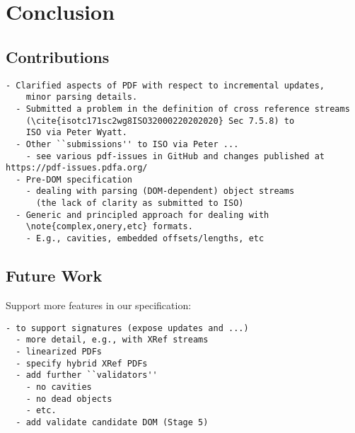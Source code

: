 \section{Conclusion }
\label{sec:conclusion}

\subsection{Contributions}

\begin{lstlisting}[style=meta]
  - Clarified aspects of PDF with respect to incremental updates,
    minor parsing details.
  - Submitted a problem in the definition of cross reference streams
    (\cite{isotc171sc2wg8ISO32000220202020} Sec 7.5.8) to
    ISO via Peter Wyatt.
  - Other ``submissions'' to ISO via Peter ...
    - see various pdf-issues in GitHub and changes published at https://pdf-issues.pdfa.org/
  - Pre-DOM specification
    - dealing with parsing (DOM-dependent) object streams
      (the lack of clarity as submitted to ISO)
  - Generic and principled approach for dealing with
    \note{complex,onery,etc} formats.
    - E.g., cavities, embedded offsets/lengths, etc
\end{lstlisting}

\subsection{Future Work}

Support more features in our specification:
\begin{lstlisting}[style=meta]
  - to support signatures (expose updates and ...)
  - more detail, e.g., with XRef streams
  - linearized PDFs
  - specify hybrid XRef PDFs
  - add further ``validators''
    - no cavities
    - no dead objects
    - etc.
  - add validate candidate DOM (Stage 5)
\end{lstlisting}

